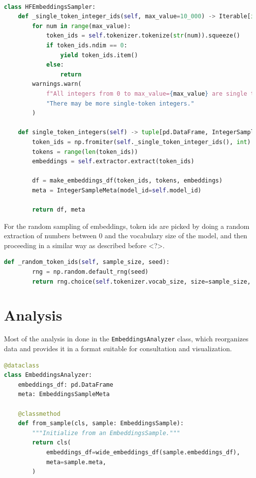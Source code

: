 \documentclass[
  a4paper, twoside, 10pt, titlepage]{book}
\begin{document}
\begin{lstlisting}[language=Python]

class HFEmbeddingsSampler:
    def _single_token_integer_ids(self, max_value=10_000) -> Iterable[int]:
        for num in range(max_value):
            token_ids = self.tokenizer.tokenize(str(num)).squeeze()
            if token_ids.ndim == 0:
                yield token_ids.item()
            else:
                return
        warnings.warn(
            f"All integers from 0 to max_value={max_value} are single token. "
            "There may be more single-token integers."
        )

    def single_token_integers(self) -> tuple[pd.DataFrame, IntegerSampleMeta]:
        token_ids = np.fromiter(self._single_token_integer_ids(), int)
        tokens = range(len(token_ids))
        embeddings = self.extractor.extract(token_ids)

        df = make_embeddings_df(token_ids, tokens, embeddings)
        meta = IntegerSampleMeta(model_id=self.model_id)

        return df, meta
\end{lstlisting}

For the random sampling of embeddings, token ids are picked by doing a
random extraction of numbers between 0 and the vocabulary size of the
model, and then proceeding in a similar way as described before
\textless?\textgreater.

\begin{lstlisting}[language=Python]
    def _random_token_ids(self, sample_size, seed):
        rng = np.random.default_rng(seed)
        return rng.choice(self.tokenizer.vocab_size, size=sample_size, replace=False)
\end{lstlisting}

\section{Analysis}\label{analysis}

Most of the analysis in done in the
\passthrough{\lstinline!EmbeddingsAnalyzer!} class, which reorganizes
data and provides it in a format suitable for consultation and
visualization.

\begin{lstlisting}[language=Python]
@dataclass
class EmbeddingsAnalyzer:
    embeddings_df: pd.DataFrame
    meta: EmbeddingsSampleMeta

    @classmethod
    def from_sample(cls, sample: EmbeddingsSample):
        """Initialize from an EmbeddingsSample."""
        return cls(
            embeddings_df=wide_embeddings_df(sample.embeddings_df),
            meta=sample.meta,
        )
\end{lstlisting}
\end{document}
